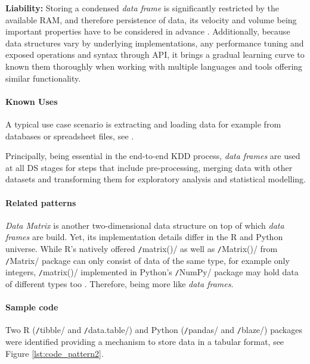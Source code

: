 \textbf{Liability:}
Storing a condensed \emph{data frame} is significantly restricted by the available \ac{RAM}, and therefore persistence of data, its velocity and volume being important properties have to be considered in advance \parencites{SimonBGDRAMR2016}{Fern2016}. 
Additionally, because data structures vary by underlying implementations, any performance tuning and exposed operations and syntax through \ac{API}, it brings a gradual learning curve to known them thoroughly when working with multiple languages and tools offering similar functionality.

\paragraph*{Known Uses}
\begin{compactitem}
   \item A typical use case scenario is extracting and loading data for example from databases or spreadsheet files, see \textcites{NinaBookR2014}{PSDS2017}.
   \item Principally, being essential in the end-to-end \ac{KDD} process, \emph{data frames} are used at all \ac{DS} stages for steps that include pre-processing, merging data with other datasets and transforming them for exploratory analysis and statistical modelling.
\end{compactitem}

\paragraph*{Related patterns}
\emph{Data Matrix} is another two-dimensional data structure on top of which \emph{data frames} are build.
Yet, its implementation details differ in the R and Python universe. 
While R's natively offered \texttt/matrix()/ as well as \texttt/Matrix()/ from \texttt/Matrix/ package can only consist of data of the same type, for example only integers, \texttt/matrix()/ implemented in Python's \texttt/NumPy/ package may hold data of different types too \parencites{Numpy2011}{MatrixCran2017}. 
Therefore, being more like \emph{data frames}.

\paragraph*{Sample code}
Two R (\texttt/tibble/ and \texttt/data.table/) and Python (\texttt/pandas/ and \texttt/blaze/) packages were identified providing a mechanism to store data in a tabular format, see Figure \ref{lst:code_pattern2}.  

